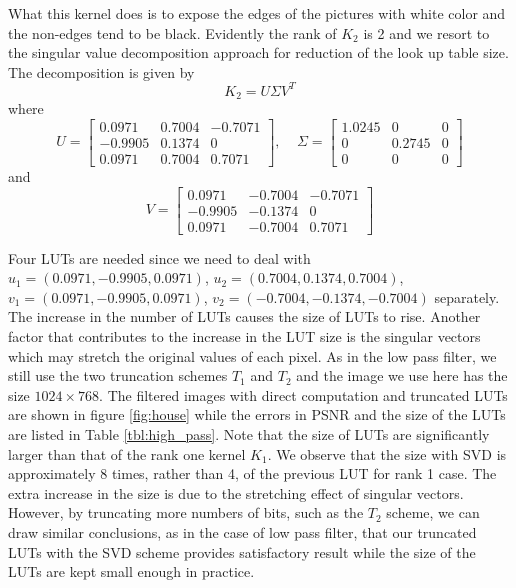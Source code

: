 \documentclass[12pt]{amsart}
\theoremstyle{definition}
\theoremstyle{remark}
\numberwithin{thm}{section}
\begin{document}
What this kernel does is to expose the edges of the pictures with white  color and the non-edges tend to be black. Evidently the rank of $K_2$ is 2 and we resort to the singular value decomposition approach for reduction of the look up table size. The decomposition is given by 
$$
K_2=U\Sigma V^T
$$
where
$$
U=
\begin{bmatrix}
 0.0971 & 0.7004 & -0.7071\\
-0.9905 & 0.1374 & 0\\
 0.0971 & 0.7004 & 0.7071
\end{bmatrix}
, \ \ \ \ \ \Sigma=
\begin{bmatrix}
1.0245 & 0 & 0\\
0& 0.2745 & 0\\
0 & 0 & 0
\end{bmatrix}
$$
and
$$
V=
\begin{bmatrix}
 0.0971 & -0.7004 & -0.7071\\
-0.9905 & -0.1374 & 0\\
 0.0971 & -0.7004 & 0.7071
\end{bmatrix}
$$

Four LUTs are needed since we need to deal with $u_1=(0.0971,-0.9905,0.0971)$, $u_2=(0.7004,0.1374,0.7004)$, $v_1=(0.0971,-0.9905,0.0971)$, $v_2=(-0.7004,-0.1374,-0.7004)$ separately. The increase in the number of LUTs causes the size of LUTs to rise. Another factor that contributes to the increase in the LUT size is the singular vectors which may stretch the original values of each pixel. As in the low pass filter, we still use the two truncation schemes $T_1$ and $T_2$ and the image we use here has the size $1024\times 768$. The filtered images with direct computation and truncated LUTs are shown in figure \ref{fig:house} while the errors in PSNR and the size of the LUTs are listed in Table \ref{tbl:high_pass}. 
Note that the size of LUTs are significantly larger than that of the rank one kernel $K_1$. We observe that the size with SVD is approximately 8 times, rather than 4, of the previous LUT for rank 1 case. The extra increase in the size is due to the stretching effect of singular vectors. However, by truncating more numbers of bits, such as the $T_2$ scheme, we can draw similar conclusions, as in the case of low pass filter, that our truncated LUTs with the SVD scheme provides satisfactory result while the size of the LUTs are kept small enough in practice. 
\end{document}
